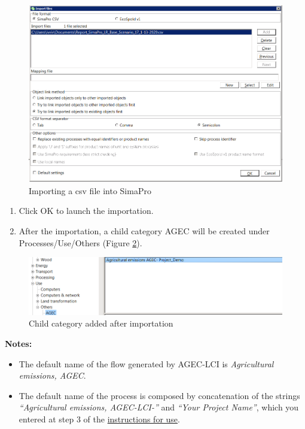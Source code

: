 \documentclass[openany]{book}
\begin{document}
\begin{figure}[ht]

{\centering \includegraphics[width=0.85\linewidth]{Figures/simapro_step1} 

}

\caption{Importing a csv file into SimaPro}\label{fig:simapro-step1}
\end{figure}

\begin{enumerate}
\def\labelenumi{\arabic{enumi}.}
\setcounter{enumi}{4}
\item
  Click OK to launch the importation.
\item
  After the importation, a child category AGEC will be created under Processes/Use/Others (Figure \ref{fig:simapro-step2}).
\end{enumerate}

\begin{figure}[ht]

{\centering \includegraphics[width=0.85\linewidth]{Figures/simapro_step2} 

}

\caption{Child category added after importation}\label{fig:simapro-step2}
\end{figure}

\textbf{Notes:}

\begin{itemize}
\item
  The default name of the flow generated by AGEC-LCI is \emph{Agricultural emissions, AGEC}.
\item
  The default name of the process is composed by concatenation of the strings \emph{``Agricultural emissions, AGEC-LCI-''} and \emph{``Your Project Name''}, which you entered at step 3 of the \protect\hyperlink{instructions}{instructions for use}.
\end{itemize}
\end{document}
